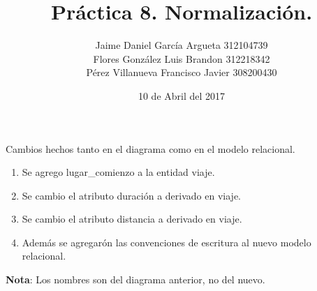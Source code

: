 \documentclass{article}
\title{Práctica 8. Normalización.}
\author{Jaime Daniel García Argueta 312104739\\
		Flores González Luis Brandon 312218342\\
		Pérez Villanueva Francisco Javier 308200430}
\date{10 de Abril del 2017}
\begin{document}
\maketitle

Cambios hechos tanto en el diagrama como en el modelo relacional.\\
\begin{enumerate}
	\item Se agrego lugar\_comienzo a la entidad viaje.
	\item Se cambio el atributo duración a derivado en viaje.
	\item Se cambio el atributo distancia a derivado en viaje.
	\item Además se agregarón las convenciones de escritura al nuevo modelo relacional.
\end{enumerate}

\textbf{Nota}: Los nombres son del diagrama anterior, no del nuevo.\\
\end{document}
